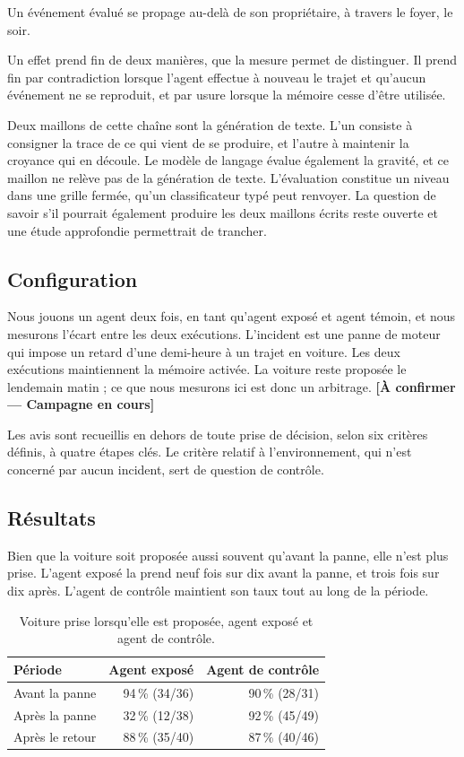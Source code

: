 Un événement évalué se propage au-delà de son propriétaire, à travers le foyer, le soir.

Un effet prend fin de deux manières, que la mesure permet de distinguer. Il prend fin par contradiction lorsque l'agent effectue à nouveau le trajet et qu'aucun événement ne se reproduit, et par usure lorsque la mémoire cesse d'être utilisée.

Deux maillons de cette chaîne sont la génération de texte. L'un consiste à consigner la trace de ce qui vient de se produire, et l'autre à maintenir la croyance qui en découle. Le modèle de langage évalue également la gravité, et ce maillon ne relève pas de la génération de texte. L'évaluation constitue un niveau dans une grille fermée, qu'un classificateur typé peut renvoyer. La question de savoir s'il pourrait également produire les deux maillons écrits reste ouverte et une étude approfondie permettrait de trancher.

\subsection{Configuration}
\label{sec:setup}

Nous jouons un agent deux fois, en tant qu'agent exposé et agent témoin, et nous mesurons l'écart entre les deux exécutions. L'incident est une panne de moteur qui impose un retard d'une demi-heure à un trajet en voiture. Les deux exécutions maintiennent la mémoire activée. La voiture reste proposée le lendemain matin ; ce que nous mesurons ici est donc un arbitrage. \textbf{[À confirmer --- Campagne en cours]}

Les avis sont recueillis en dehors de toute prise de décision, selon six critères définis, à quatre étapes clés. Le critère relatif à l'environnement, qui n'est concerné par aucun incident, sert de question de contrôle.

\subsection{Résultats}
\label{sec:traced-results}

Bien que la voiture soit proposée aussi souvent qu'avant la panne, elle n'est plus prise. L'agent exposé la prend neuf fois sur dix avant la panne, et trois fois sur dix après. L'agent de contrôle maintient son taux tout au long de la période.

\begin{table}[tbp]
  \caption{Voiture prise lorsqu'elle est proposée, agent exposé et agent de contrôle.}
  \label{tab:offered}
  \begin{tabular}{@{}lrr@{}}
    \toprule
    Période & Agent exposé & Agent de contrôle \\
    \midrule
    Avant la panne  & 94\,\% (34/36) & 90\,\% (28/31) \\
    Après la panne  & 32\,\% (12/38) & 92\,\% (45/49) \\
    Après le retour & 88\,\% (35/40) & 87\,\% (40/46) \\
    \bottomrule
  \end{tabular}
\end{table}

